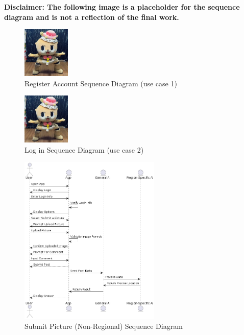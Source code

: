 \documentclass[]{article}
\begin{document}
\textbf{Disclaimer: The following image is a placeholder for the sequence diagram and is not a reflection of the final work.}


\begin{figure}[H]
    \centering
    \includegraphics[width=0.2\textwidth]{removelater.jpg} %
    \caption{Register Account Sequence Diagram (use case 1)}
\end{figure}

\begin{figure}[H]
    \centering
    \includegraphics[width=0.2\textwidth]{removelater.jpg} %
    \caption{Log in Sequence Diagram (use case 2)}
\end{figure}


\begin{figure}[H]
    \centering
    \includegraphics[width=0.6\textwidth]{out/sequence3/sequence3.png} %
    \caption{Submit Picture (Non-Regional) Sequence Diagram}
\end{figure}
\end{document}
